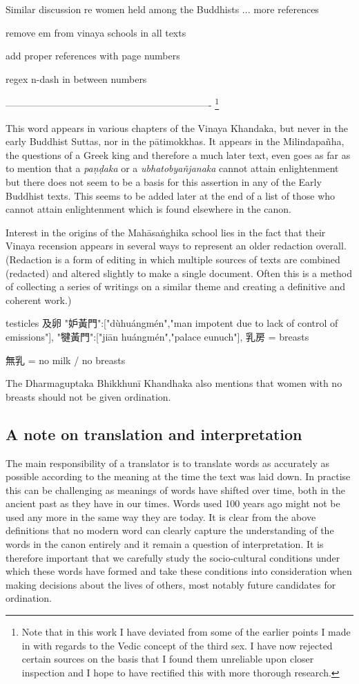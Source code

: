 Similar discussion re women held among the Buddhists ... more references

remove em from vinaya schools in all texts

add proper references with page numbers

regex n-dash in between numbers

----------------------------------------------------------------
\footnote{Note that in this work I have deviated from some of the earlier points I made in \cite{vimala} with regards to the Vedic concept of the third sex. I have now rejected certain sources on the basis that I found them unreliable upon closer inspection and I hope to have rectified this with more thorough research.}


This word appears in various chapters of the Vinaya Khandaka, but never in the early Buddhist Suttas, nor in the pātimokkhas. It appears in the Milindapañha, the questions of a Greek king and therefore a much later text, even goes as far as to mention that a {\em paṇḍaka } or a {\em ubhatob­yañ­janaka } cannot attain enlightenment but there does not seem to be a basis for this assertion in any of the Early Buddhist texts. This seems to be added later at the end of a list of those who cannot attain enlightenment which is found elsewhere in the canon.

Interest in the origins of the Mahāsaṅghika school lies in the fact that their Vinaya recension appears in several ways to represent an older redaction overall. (Redaction is a form of editing in which multiple sources of texts are combined (redacted) and altered slightly to make a single document. Often this is a method of collecting a series of writings on a similar theme and creating a definitive and coherent work.)

testicles 及卵
"妒黃門":["dùhuángmén","man impotent due to lack of control of emissions"],
"犍黃門":["jiān huángmén","palace eunuch"],
乳房 = breasts

無乳 = no milk / no breasts

The Dharmaguptaka Bhikkhunī Khandhaka also mentions that women with no breasts should not be given ordination.

\subsection{A note on translation and interpretation}
The main responsibility of a translator is to translate words as accurately as possible according to the meaning at the time the text was laid down. In practise this can be challenging as meanings of words have shifted over time, both in the ancient past as they have in our times. Words used 100 years ago might not be used any more in the same way they are today. It is clear from the above definitions that no modern word can clearly capture the understanding of the words in the canon entirely and it remain a question of interpretation. It is therefore important that we carefully study the socio-cultural conditions under which these words have formed and take these conditions into consideration when making decisions about the lives of others, most notably future candidates for ordination.


